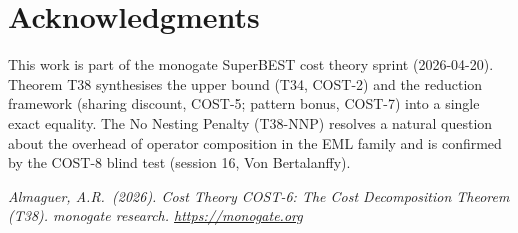 \documentclass[12pt,a4paper]{article}
\theoremstyle{definition}
\begin{document}
\section*{Acknowledgments}

This work is part of the monogate SuperBEST cost theory sprint (2026-04-20).
Theorem T38 synthesises the upper bound (T34, COST-2) and the reduction
framework (sharing discount, COST-5; pattern bonus, COST-7) into a single
exact equality.  The No Nesting Penalty (T38-NNP) resolves a natural
question about the overhead of operator composition in the EML family and
is confirmed by the COST-8 blind test (session 16, Von Bertalanffy).

\bigskip
\noindent\textit{Almaguer, A.R.\ (2026).
Cost Theory COST-6: The Cost Decomposition Theorem (T38).
monogate research. \url{https://monogate.org}}
\end{document}
